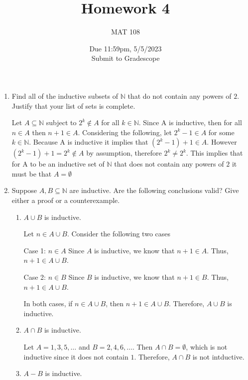 \documentclass{article}
\title{Homework 4}
\author{MAT 108}
\date{Due 11:59pm, 5/5/2023\\ 
\vspace{0.1cm}
Submit to Gradescope}
\newcommand{\bN}{\mathbb{N}}
\begin{document}
\maketitle

{\large

\begin{enumerate}[labelindent=0pt,leftmargin=0pt]

    \setlength{\itemsep}{13pt} 

    \item Find all of the inductive subsets of $\bN$ that do not contain any powers of $2$. Justify that your list of sets is complete.
    
    Let $A\subseteq\bN$ subject to $2^k \notin A$ for all $k\in\bN$. Since A is inductive, then for all $n\in A$ then $n+1\in A$. 
    Considering the following, let $2^k-1\in A$ for some $k\in\bN$. Because A is inductive it implies that $(2^k-1)+1\in A$. 
    However $(2^k-1)+1=2^k\notin A$ by assumption, therefore $2^k \neq 2^k$. This implies that for A to be an inductive set of $\bN$ that does not contain any powers of $2$ it must be that $A=\emptyset$




    \item Suppose $A,B\subseteq\bN$ are inductive. Are the following conclusions valid? Give either a proof or a counterexample.

    \begin{enumerate}
    \item $A\cup B$ is inductive.
    
    Let $n \in A \cup B$. Consider the following two cases 

    Case 1: $n \in A$
    Since $A$ is inductive, we know that $n+1 \in A$. Thus, $n+1 \in A \cup B$.

    Case 2: $n \in B$
    Since $B$ is inductive, we know that $n+1 \in B$. Thus, $n+1 \in A \cup B$.

    In both cases, if $n \in A \cup B$, then $n+1 \in A \cup B$. Therefore, $A \cup B$ is inductive.


    \item $A\cap B$ is inductive.
    
    Let $A={1,3,5,\ldots}$ and $B={2,4,6,\ldots}$. 
    Then $A\cap B=\emptyset$, which is not inductive since it does not contain $1$. 
    Therefore, $A\cap B$ is not intductive. 


    \item $A-B$ is inductive.
   

\end{enumerate}
\end{enumerate}}
\end{document}
